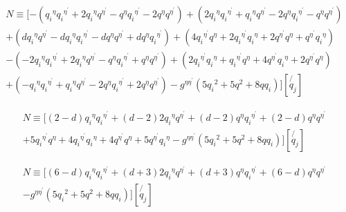 \begin{equation}
\begin{split}
N\equiv [-({q_i}^{{\eta}}{q_i}^{{\eta}^{\prime}}+2{q_i}^{{\eta}}{q}^{{\eta}^{\prime}}-{q}^{{\eta}}{q_i}^{{\eta}^{\prime}}-2{q}^{{\eta}}{q}^{{\eta}^{\prime}})
+(2{q_i}^{{\eta}}{q_i}^{{\eta}^{\prime}}+{q_i}^{{\eta}}{q}^{{\eta}^{\prime}}-2{q}^{{\eta}}{q_i}^{{\eta}^{\prime}}-{q}^{{\eta}}{q}^{{\eta}^{\prime}})\\+(d{q_i}^{{\eta}}{q}^{{\eta}^{\prime}}-d{q_i}^{{\eta}}{q_i}^{{\eta}^{\prime}}-d{q}^{{\eta}}{q}^{{\eta}^{\prime}}+d{q}^{{\eta}}{q_i}^{{\eta}^{\prime}})+(4{q_i}^{{\eta}^{\prime}}{q}^{{\eta}}+2{q_i}^{{\eta}^{\prime}}{q_i}^{{\eta}}+2{q}^{{\eta}^{\prime}}{q}^{{\eta}}+{q}^{{\eta}^{\prime}}{q_i}^{{\eta}})\\
-(-2{q_i}^{{\eta}}{q_i}^{{\eta}^{\prime}}+2{q_i}^{{\eta}}{q}^{{\eta}^{\prime}}-{q}^{{\eta}}{q_i}^{{\eta}^{\prime}}+{q}^{{\eta}}{q}^{{\eta}^{\prime}})+(2{q_i}^{{\eta}^{\prime}}{q_i}^{{\eta}}+{q_i}^{{\eta}^{\prime}}{q}^{{\eta}}+4{q}^{{\eta}^{\prime}}{q_i}^{{\eta}}+2{q}^{{\eta}^{\prime}}{q}^{{\eta}})\\+(-{q_i}^{{\eta}}{q_i}^{{\eta}^{\prime}}+{q_i}^{{\eta}}{q}^{{\eta}^{\prime}}-2{q}^{{\eta}}{q_i}^{{\eta}^{\prime}}+2{q}^{{\eta}}{q}^{{\eta}^{\prime}})
-g^{{\eta}{{\eta}^{\prime}}}(5{q_i}^2+5{q}^2+8qq_i)][\not{q_j}]
\end{split}
\end{equation}

\begin{equation}
\begin{split}
N\equiv [(2-d){q_i}^{{\eta}}{q_i}^{{\eta}^{\prime}}+(d-2)2{q_i}^{{\eta}}{q}^{{\eta}^{\prime}}+(d-2){q}^{{\eta}}{q_i}^{{\eta}^{\prime}}+(2-d){q}^{{\eta}}{q}^{{\eta}^{\prime}}\\
+5{q_i}^{{\eta}^{\prime}}{q}^{{\eta}}+4{q_i}^{{\eta}^{\prime}}{q_i}^{{\eta}}+4{q}^{{\eta}^{\prime}}{q}^{{\eta}}+5{q}^{{\eta}^{\prime}}{q_i}^{{\eta}}
-g^{{\eta}{{\eta}^{\prime}}}(5{q_i}^2+5{q}^2+8qq_i)][\not{q_j}]
\end{split}
\end{equation}

\begin{equation}
\begin{split}
N\equiv [(6-d){q_i}^{{\eta}}{q_i}^{{\eta}^{\prime}}+(d+3)2{q_i}^{{\eta}}{q}^{{\eta}^{\prime}}+(d+3){q}^{{\eta}}{q_i}^{{\eta}^{\prime}}+(6-d){q}^{{\eta}}{q}^{{\eta}^{\prime}}\\-g^{{\eta}{{\eta}^{\prime}}}(5{q_i}^2+5{q}^2+8qq_i)][\not{q_j}]
\end{split}
\end{equation}

